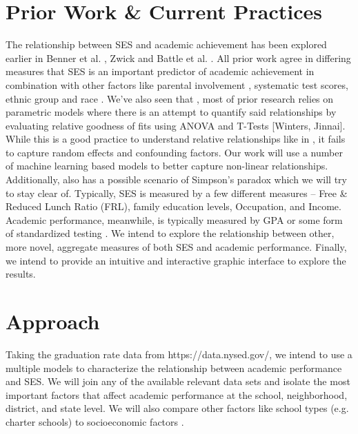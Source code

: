 \documentclass[sigconf,nonacm,11pt]{acmart}
\begin{document}
\section{Prior Work \& Current Practices}
The relationship between SES and academic achievement has been explored earlier in Benner et al. \cite{parentalinvolvement}, Zwick \cite{ collegescores} and Battle et al. \cite {raceses}. All prior work agree in differing measures that SES is an important predictor of academic achievement in combination with other factors like parental involvement \cite {parentalinvolvement}, systematic test scores, ethnic group \cite{collegescores} and race \cite{raceses}. We've also seen that \cite {parentalinvolvement, collegescores, raceses, farooq}, most of prior research relies on parametric models where there is an attempt to quantify said relationships by evaluating relative goodness of fits using ANOVA and T-Tests [Winters, Jinnai]. While this is a good practice to understand relative relationships like in \cite{collegescores, raceses}, it fails to capture random effects and confounding factors. Our work will use a number of machine learning based models to better capture non-linear relationships. Additionally, \cite{collegescores} also has a possible scenario of Simpson's paradox which we will try to stay clear of. Typically, \cite{sirin} SES is measured by a few different measures -- Free \& Reduced Lunch Ratio (FRL), family education levels, Occupation, and Income.  Academic performance, meanwhile, is typically measured by GPA or some form of standardized testing \cite{sirin}.  We intend to explore the relationship between other, more novel, aggregate measures of both SES and academic performance. Finally, we intend to provide an intuitive and interactive graphic interface to explore the results.

\section{Approach}
Taking the graduation rate data from https://data.nysed.gov/, we intend to use a multiple models to characterize the relationship between academic performance and SES.  We will join any of the available relevant data sets and isolate the most important factors that affect academic performance at the school, neighborhood, district, and state level. We will also compare other factors like school types (e.g. charter schools) to socioeconomic factors .
\end{document}
